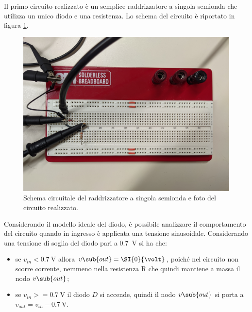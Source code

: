 Il primo circuito realizzato è un semplice raddrizzatore a singola semionda che utilizza un unico diodo e una resistenza. Lo schema del circuito è riportato in figura \ref{fig:circuito_1}.
\begin{figure}[h]
	\centering
	\begin{minipage}{.45\textwidth}
	\end{minipage}\qquad
	\begin{minipage}{.48\textwidth}
	\includegraphics[width=\linewidth]{./ImageFiles/Laboratorio 2/CIR1.jpg}
	\end{minipage}
	\caption{Schema circuitale del raddrizzatore a singola semionda e foto del circuito realizzato.}
	\label{fig:circuito_1}
\end{figure}
Considerando il modello ideale del diodo, è possibile analizzare il comportamento del circuito quando in ingresso è applicata una tensione sinusoidale. Considerando una tensione di soglia del diodo pari a \SI{0.7}{\volt} si ha che:
\begin{itemize}
	\item se $v_{in}<\SI{0.7}{\volt}$ allora $v\sub{out}=\SI{0}{\volt}$, poiché nel circuito non scorre corrente, nemmeno nella resistenza R che quindi mantiene a massa il nodo $v\sub{out}$;
	\item se $v_{in} >= \SI{0.7}{\volt}$ il diodo $D$ si accende, quindi il nodo $v\sub{out}$ si porta a $v_{out}=v_{in}-\SI{0.7}{\volt}$.
\end{itemize}
